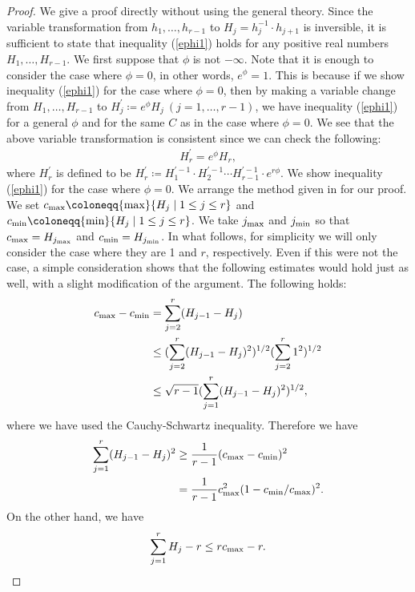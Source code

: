 \documentclass[12pt]{article}
\theoremstyle{definition}
\def\max{{\rm max}}
\def\min{{\rm min}}
\begin{document}
\begin{proof} We give a proof directly without using the general theory. Since the variable transformation from $h_1,\dots, h_{r-1}$ to $H_j=h_j^{-1}\cdot h_{j+1}$ is inversible, it is sufficient to state that inequality (\ref{ephi1}) holds for any positive real numbers $H_1,\dots, H_{r-1}$. We first suppose that $\phi$ is not $-\infty$. Note that it is enough to consider the case where $\phi=0$, in other words, $e^\phi=1$. This is because if we show inequality (\ref{ephi1}) for the case where $\phi=0$, then by making a variable change from $H_1,\dots, H_{r-1}$ to $H_j^\prime\coloneqq e^{\phi} H_j\ (j=1,\dots, r-1)$, we have inequality (\ref{ephi1}) for a general $\phi$ and for the same $C$ as in the case where $\phi=0$. We see that the above variable transformation is consistent since we can check the following:
\begin{align*}
H_r^\prime=e^\phi H_r,
\end{align*} 
where $H_r^\prime$ is defined to be $H_r^\prime\coloneqq H_1^{\prime-1}\cdot H_2^{\prime-1}\cdots H_{r-1}^{\prime-1}\cdot e^{r\phi}$. We show inequality (\ref{ephi1}) for the case where $\phi=0$. We arrange the method given in \cite[Proof of Proposition 3.8]{LM1} for our proof. We set $c_\max\coloneqq \max\{H_j\mid 1\leq j\leq r\}$ and $c_\min\coloneqq \min \{H_j\mid 1\leq j\leq r\}$. We take $j_\max$ and $j_\min$ so that $c_\max=H_{j_\max}$ and $c_\min=H_{j_\min}$. 
In what follows, for simplicity we will only consider the case where they are 1 and $r$, respectively. Even if this were not the case, a simple consideration shows that the following estimates would hold just as well, with a slight modification of the argument. The following holds:
\begin{align*}
c_\max-c_\min&=\sum_{j=2}^r(H_{j-1}-H_j)\\
&\leq (\sum_{j=2}^r(H_{j-1}-H_j)^2)^{1/2}(\sum_{j=2}^r1^2)^{1/2}\\
&\leq \sqrt{r-1}(\sum_{j=1}^r(H_{j-1}-H_j)^2)^{1/2},
\end{align*}
where we have used the Cauchy-Schwartz inequality. Therefore we have 
\begin{align}
\sum_{j=1}^r(H_{j-1}-H_j)^2&\geq \frac{1}{r-1}(c_\max-c_\min)^2 \notag \\
&=\frac{1}{r-1}c_\max^2(1-c_\min/c_\max)^2. \label{cmax}
\end{align}
On the other hand, we have
\begin{align*}
\sum_{j=1}^rH_j-r\leq rc_\max-r.
\end{align*}

\end{proof}
\end{document}
